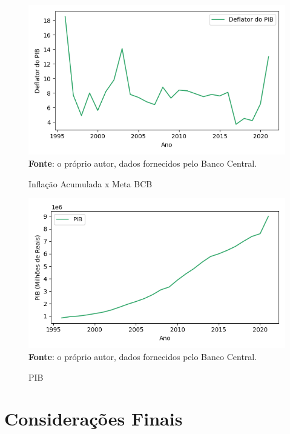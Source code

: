 \documentclass[12pt,oneside,a4paper,chapter=TITLE,english,brazil,sumario=abnt-6027-2012]{abntex2}
\begin{document}
\begin{figure}[H]
	
	\caption{Inflação Acumulada x Meta BCB}
	
	\includegraphics[]{fig/ibge_deflator_96_21_t.png}\\
	
	\footnotesize \textbf{Fonte}: o próprio autor, dados fornecidos pelo Banco Central.
	
\end{figure}

\begin{figure}[H]
	
	\caption{PIB}
	
	\includegraphics[]{fig/ibge_pib_rsmi_96_21_t.png}\\
	
	\footnotesize \textbf{Fonte}: o próprio autor, dados fornecidos pelo Banco Central.
	
	
\end{figure}


\chapter{Considerações Finais}
\end{document}
